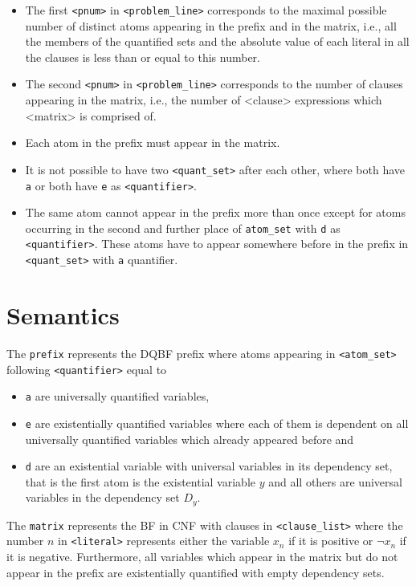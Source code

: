 \documentclass[
  digital, %
  color,
  twoside, %
  table,   %
  nolof,     %
  nolot,     %
]{fithesis3}
\theoremstyle{definition}
\theoremstyle{remark}
\begin{document}
\begin{itemize}
    \item The first \verb|<pnum>| in \verb|<problem_line>| corresponds to the maximal possible number of distinct atoms appearing in the prefix and in the matrix, i.e., all the members of the quantified sets and the absolute value of each literal in all the clauses is less than or equal to this number.
    \item \begin{sloppypar} The second \verb|<pnum>| in \verb|<problem_line>| corresponds to the number of clauses appearing in the matrix, i.e., the number of <clause> expressions which <matrix> is comprised of. \end{sloppypar}
    \item Each atom in the prefix must appear in the matrix.
    \item It is not possible to have two \verb|<quant_set>| after each other, where both have \verb|a| or both have \verb|e| as \verb|<quantifier>|.
    \item The same atom cannot appear in the prefix more than once except for atoms occurring in the second and further place of \verb|atom_set| with \verb|d| as \verb|<quantifier>|. These atoms have to appear somewhere before in the prefix in \verb|<quant_set>| with \verb|a| quantifier.
\end{itemize}

\section{Semantics}
The \verb|prefix| represents the DQBF prefix where atoms appearing in \verb|<atom_set>| following \verb|<quantifier>| equal to
\begin{itemize}
    \item \verb|a| are universally quantified variables,
    \item \verb|e| are existentially quantified variables where each of them is dependent on all universally quantified variables which already appeared before and 
    \item \verb|d| are an existential variable with universal variables in its dependency set, that is the first atom is the existential variable $y$ and all others are universal variables in the dependency set $D_y$.
\end{itemize}

\begin{sloppypar}
The \verb|matrix| represents the BF in CNF with clauses in \verb|<clause_list>| where the number $n$ in \verb|<literal>| represents either the variable $x_n$ if it is positive or $\neg x_n$ if it is negative. Furthermore, all variables which appear in the matrix but do not appear in the prefix are existentially quantified with empty dependency sets. 
\end{sloppypar}
\end{document}
